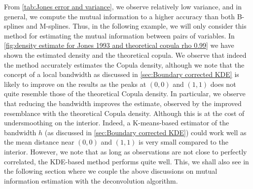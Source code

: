 \documentclass[../Thesis.tex]{subfiles}
\begin{document}
From \autoref{tab:Jones error and variance}, we observe relatively low variance, and in general, we compute the mutual information to a higher accuracy than both B-splines and M-splines. Thus, in the following example, we will only consider this method for estimating the mutual information between pairs of variables. In \autoref{fig:density estimate for Jones 1993 and theoretical copula rho 0.99} we have shown the estimated density and the theoretical copula. We observe that indeed the method accurately estimates the Copula density, although we note that the concept of a local bandwidth as discussed in \autoref{sec:Boundary corrected KDE} is likely to improve on the results as the peaks at $(0,0)$ and $(1,1)$ does not quite resemble those of the theoretical Copula density. In particular, we observe that reducing the bandwidth improves the estimate, observed by the improved resemblance with the theoretical Copula density. Although this is at the cost of undersmoothing on the interior. Indeed, a K-means-based estimator of the bandwidth $h$ (as discussed in \autoref{sec:Boundary corrected KDE}) could work well as the mean distance near $(0,0)$ and $(1,1)$ is very small compared to the interior. However, we note that as long as observations are not close to perfectly correlated, the KDE-based method performs quite well. This, we shall also see in the following section where we couple the above discussions on mutual information estimation with the deconvolution algorithm.
\newpage
\end{document}
